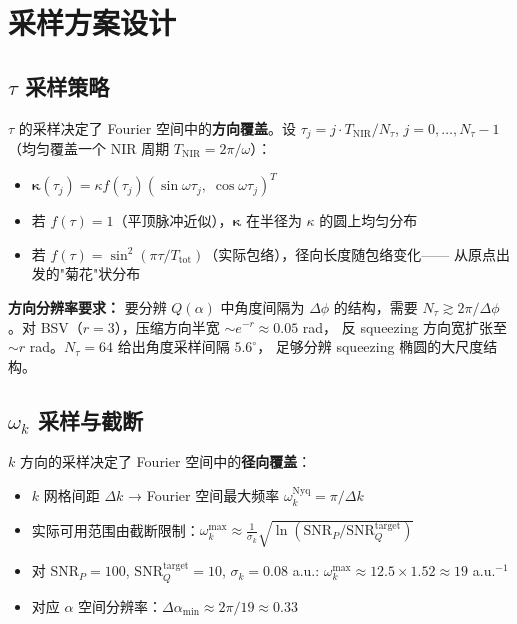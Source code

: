 \documentclass[11pt,a4paper]{ctexart}
\begin{document}
\section{采样方案设计}

\subsection{$\tau$ 采样策略}

$\tau$ 的采样决定了 Fourier 空间中的\textbf{方向覆盖}。设 $\tau_j = j \cdot T_{\text{NIR}} / N_\tau$,
$j=0,\ldots,N_\tau-1$（均匀覆盖一个 NIR 周期 $T_{\text{NIR}} = 2\pi/\omega$）：

\begin{itemize}
    \item $\boldsymbol{\kappa}(\tau_j) = \kappa f(\tau_j)(\sin\omega\tau_j,\;\cos\omega\tau_j)^T$
    \item 若 $f(\tau)=1$（平顶脉冲近似），$\boldsymbol{\kappa}$ 在半径为 $\kappa$ 的圆上均匀分布
    \item 若 $f(\tau)=\sin^2(\pi\tau/T_{\text{tot}})$（实际包络），径向长度随包络变化——
        从原点出发的"菊花"状分布
\end{itemize}

\textbf{方向分辨率要求：} 要分辨 $Q(\alpha)$ 中角度间隔为 $\Delta\phi$ 的结构，需要
$N_\tau \gtrsim 2\pi/\Delta\phi$。对 BSV（$r=3$），压缩方向半宽 $\sim e^{-r} \approx 0.05$ rad，
反 squeezing 方向宽扩张至 $\sim r$ rad。$N_\tau = 64$ 给出角度采样间隔 $5.6^\circ$，
足够分辨 squeezing 椭圆的大尺度结构。

\subsection{$\omega_k$ 采样与截断}

$k$ 方向的采样决定了 Fourier 空间中的\textbf{径向覆盖}：

\begin{itemize}
    \item $k$ 网格间距 $\Delta k$ → Fourier 空间最大频率 $\omega_k^{\text{Nyq}} = \pi/\Delta k$
    \item 实际可用范围由截断限制：$\omega_k^{\max} \approx
        \frac{1}{\sigma_k}\sqrt{\ln(\text{SNR}_P / \text{SNR}_Q^{\text{target}})}$
    \item 对 $\text{SNR}_P = 100$, $\text{SNR}_Q^{\text{target}} = 10$, $\sigma_k = 0.08$ a.u.:
        $\omega_k^{\max} \approx 12.5 \times 1.52 \approx 19$ a.u.${}^{-1}$
    \item 对应 $\alpha$ 空间分辨率：$\Delta\alpha_{\min} \approx 2\pi/19 \approx 0.33$
\end{itemize}
\end{document}
